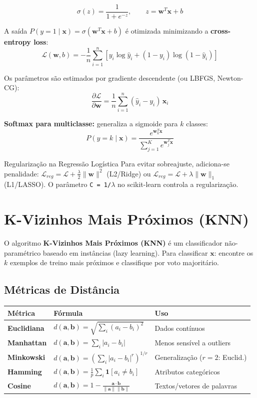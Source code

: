 \documentclass[12pt,a4paper]{article}
\begin{document}
\[
  \sigma(z) = \frac{1}{1 + e^{-z}}, \qquad z = \mathbf{w}^T \mathbf{x} + b
\]

A saída $P(y=1 \mid \mathbf{x}) = \sigma(\mathbf{w}^T\mathbf{x} + b)$ é otimizada minimizando a \textbf{cross-entropy loss}:
\[
  \mathcal{L}(\mathbf{w}, b) = -\frac{1}{n} \sum_{i=1}^{n} \left[ y_i \log \hat{y}_i + (1 - y_i) \log(1 - \hat{y}_i) \right]
\]

Os parâmetros são estimados por gradiente descendente (ou LBFGS, Newton-CG):
\[
  \frac{\partial \mathcal{L}}{\partial \mathbf{w}} = \frac{1}{n} \sum_{i=1}^n (\hat{y}_i - y_i)\, \mathbf{x}_i
\]

\textbf{Softmax para multiclasse:} generaliza a sigmoide para $k$ classes:
\[
  P(y = k \mid \mathbf{x}) = \frac{e^{\mathbf{w}_k^T \mathbf{x}}}{\sum_{j=1}^{K} e^{\mathbf{w}_j^T \mathbf{x}}}
\]

\begin{dicabox}{Regularização na Regressão Logística}
Para evitar sobreajuste, adiciona-se penalidade: $\mathcal{L}_{reg} = \mathcal{L} + \frac{\lambda}{2}\|\mathbf{w}\|^2$ (L2/Ridge) ou $\mathcal{L}_{reg} = \mathcal{L} + \lambda\|\mathbf{w}\|_1$ (L1/LASSO). O parâmetro \texttt{C = 1/$\lambda$} no scikit-learn controla a regularização.
\end{dicabox}

\section{K-Vizinhos Mais Próximos (KNN)}

O algoritmo \textbf{K-Vizinhos Mais Próximos (KNN)} é um classificador não-paramétrico baseado em instâncias (lazy learning). Para classificar $\mathbf{x}$: encontre os $k$ exemplos de treino mais próximos e classifique por voto majoritário.

\subsection{Métricas de Distância}

\begin{tabular}{>{\bfseries}p{3cm}p{6cm}p{4cm}}
\toprule
Métrica & Fórmula & Uso \\
\midrule
Euclidiana & $d(\mathbf{a},\mathbf{b}) = \sqrt{\sum_i (a_i - b_i)^2}$ & Dados contínuos \\
Manhattan & $d(\mathbf{a},\mathbf{b}) = \sum_i |a_i - b_i|$ & Menos sensível a outliers \\
Minkowski & $d(\mathbf{a},\mathbf{b}) = \left(\sum_i |a_i - b_i|^r\right)^{1/r}$ & Generalização ($r=2$: Euclid.) \\
Hamming & $d(\mathbf{a},\mathbf{b}) = \frac{1}{p}\sum_i \mathbf{1}[a_i \neq b_i]$ & Atributos categóricos \\
Cosine & $d(\mathbf{a},\mathbf{b}) = 1 - \frac{\mathbf{a} \cdot \mathbf{b}}{\|\mathbf{a}\|\|\mathbf{b}\|}$ & Textos/vetores de palavras \\
\bottomrule
\end{tabular}
\end{document}
